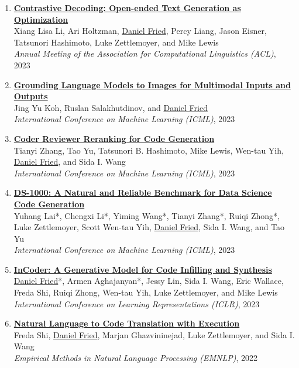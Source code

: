 \begin{enumerate}[leftmargin=-1mm,partopsep=0pt]
\item \href{https://arxiv.org/abs/2210.15097}{\textbf{Contrastive Decoding: Open-ended Text Generation as Optimization}} \\
  Xiang Lisa Li, Ari Holtzman, \underline{Daniel Fried}, Percy Liang, Jason Eisner, Tatsunori Hashimoto, Luke Zettlemoyer, and Mike Lewis\\
  \emph{Annual Meeting of the Association for Computational Linguistics (ACL)}, 2023

\item \href{https://arxiv.org/abs/2301.13823}{\textbf{Grounding Language Models to Images for Multimodal Inputs and Outputs}} \\
  Jing Yu Koh, Ruslan Salakhutdinov, and \underline{Daniel Fried}\\
  \emph{International Conference on Machine Learning (ICML)}, 2023

\item \href{https://arxiv.org/abs/2211.16490}{\textbf{Coder Reviewer Reranking for Code Generation}} \\
  Tianyi Zhang, Tao Yu, Tatsunori B. Hashimoto, Mike Lewis, Wen-tau Yih, \underline{Daniel Fried}, and Sida I. Wang\\
  \emph{International Conference on Machine Learning (ICML)}, 2023

\item \href{https://arxiv.org/abs/2211.11501}{\textbf{DS-1000: A Natural and Reliable Benchmark for Data Science Code Generation}} \\
  Yuhang Lai*, Chengxi Li*, Yiming Wang*, Tianyi Zhang*, Ruiqi Zhong*, Luke Zettlemoyer, Scott Wen-tau Yih, \underline{Daniel Fried}, Sida I. Wang, and Tao Yu\\
  \emph{International Conference on Machine Learning (ICML)}, 2023

\item \href{https://arxiv.org/abs/2204.05999}{\textbf{InCoder: A Generative Model for Code Infilling and Synthesis}} \\
  \underline{Daniel Fried}*, Armen Aghajanyan*, Jessy Lin, Sida I. Wang, Eric Wallace, Freda Shi, Ruiqi Zhong, Wen-tau Yih, Luke Zettlemoyer, and Mike Lewis\\
  \emph{International Conference on Learning Representations (ICLR)}, 2023

\item \href{https://arxiv.org/abs/2204.11454}{\textbf{Natural Language to Code Translation with Execution}} \\
  Freda Shi, \underline{Daniel Fried}, Marjan Ghazvininejad, Luke Zettlemoyer, and Sida I. Wang\\
  \emph{Empirical Methods in Natural Language Processing (EMNLP)}, 2022


\end{enumerate}
